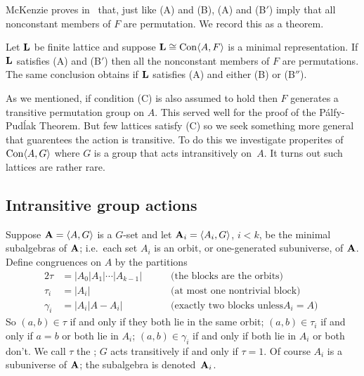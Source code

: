 McKenzie proves in~\cite{McKenzie1983} that, just like (A) and (B),
(A) and (B$'$) imply that all nonconstant members of $F$ are
permutation. We record this as a theorem.

\begin{theorem}
Let $\mathbf{L}$ be finite lattice and suppose $\mathbf{L} \cong \operatorname{Con} \langle A,F\rangle$
is a minimal representation. If $\mathbf{L}$ satisfies \textup{(A)} and
\textup{(B$'$)} then
all the nonconstant members of $F$ are permutations. 
The same conclusion obtains if 
$\mathbf{L}$ satisfies \textup{(A)} and either \textup{(B)} or
\textup{(B$''$)}.
\end{theorem}

As we mentioned, if condition (C) is also assumed to hold then
$F$ generates a transitive permutation group on $A$. 
This served well for the proof of the P\'alfy-Pud\'lak Theorem. 
But few lattices satisfy (C) so we seek something more general
that guarentees the action is transitive. To do this we investigate 
properites of $\operatorname{Con} \langle A,G\rangle$ where $G$ is a group that acts
intransitively on~$A$. It turns out such lattices are rather rare.

\subsection{Intransitive group actions} 
Suppose $\mathbf{A} = \langle A,G\rangle$ is a $G$-set and let $\mathbf{A}_i = \langle A_i, G\rangle$, $i < k$,
be the minimal subalgebras of $\mathbf{A}$; i.e.~each set $A_i$ is an orbit, or
one-generated subuniverse, of $\mathbf{A}$. Define congruences on $A$ by the 
partitions
\begin{alignat*}{2}
\tau &= |A_0|A_1|\cdots|A_{k-1}| &&\quad\text{ (the blocks are the orbits)} \\
\tau_i &= |A_i| &&\quad\text{ (at most one nontrivial block) }\\
\gamma_i &= |A_i|A - A_i| &&\quad\text{ (exactly two blocks unless
$A_i = A$) }
\end{alignat*}
So $(a,b) \in \tau$ if and only if they both lie in the same orbit;
$(a,b) \in \tau_i$ if and only if $a = b$ or both lie in $A_i$;
$(a,b) \in \gamma_i$ if and only if both lie in $A_i$ or both don't.
We call $\tau$ the ; $G$ acts transitively if and only if $\tau = 1$. 
Of course $A_i$ is a subuniverse of $\mathbf{A}$; the subalgebra
is denoted~$\mathbf{A}_i$.


